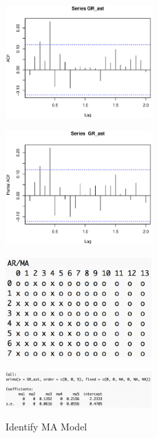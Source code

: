 \documentclass[10pt]{article}
\begin{document}
\begin{figure}[h!]
\begin{multicols}{2}   
    \begin{minipage}[h]{0.5\textwidth} 
        \centering   
        \includegraphics[width=0.5\textwidth]{pic/acf(gr_ast).eps} 
        \label{fig:apegrast:a}   
    \end{minipage}
    \begin{minipage}[h]{0.5\textwidth}   
        \centering   
        \includegraphics[width=0.5\textwidth]{pic/pacf(gr_ast)}   
        \label{fig:pierce:b}   
    \end{minipage}   
    \begin{minipage}[h]{0.5\textwidth} 
        \centering   
        \includegraphics[width=0.5\textwidth]{pic/eacf(gr_ast)}   
        \label{fig:apegrast:c}   
    \end{minipage}
    \begin{minipage}[h]{0.5\textwidth} 
    \centering   
    \includegraphics[width=0.5\textwidth]{pic/ma5}   
    \label{fig:apegrast:d}   
\end{minipage}    
    \caption{Identify MA Model} 
    \label{fig:apegrast}
\end{multicols}
\end{figure}
\end{document}
